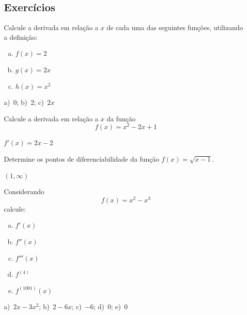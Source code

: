 \cleardoublepage\documentclass[../main.tex]{subfiles}
\begin{document}
\subsection{Exercícios}
\begin{exer}
  Calcule a derivada em relação a $x$ de cada uma das seguintes funções, utilizando a definição:
  \begin{enumerate}[a)]
  \item $f(x) = 2$
  \item $g(x) = 2x$
  \item $h(x) = x^2$
  \end{enumerate}
\end{exer}
\begin{resp}
  a)~$0$; b)~$2$; c)~$2x$
\end{resp}
\begin{exer}
  Calcule a derivada em relação a $x$ da função
  \begin{equation*}
    f(x) = x^2 - 2x + 1
  \end{equation*}
\end{exer}
\begin{resp}
  $f'(x) = 2x - 2$
\end{resp}

\begin{exer}
  Determine os pontos de diferenciabilidade da função $f(x) = \sqrt{x-1}$.
\end{exer}
\begin{resp}
  $(1, \infty)$
\end{resp}

\begin{exer}
  Considerando
  \begin{equation*}
    f(x) = x^2-x^3
  \end{equation*}
  calcule:
  \begin{multicols}{4}
  \begin{enumerate}[a)]
  \item $f'(x)$
  \item $f''(x)$
  \item $f'''(x)$
  \item $f^{(4)}$
  \item $f^{(1001)}(x)$
  \end{enumerate}
  \end{multicols}
  
\end{exer}
\begin{resp}
  a)~$2x-3x^2$; b)~$2-6x$; c)~$-6$; d)~$0$; e)~$0$
\end{resp}
\end{document}
